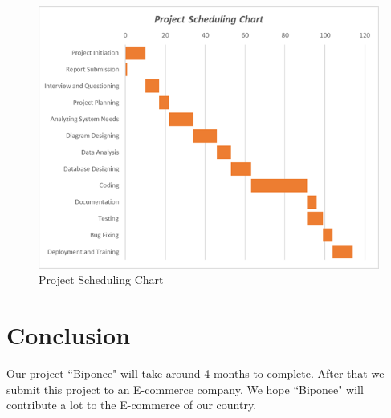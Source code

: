 \begin{figure}
 
\includegraphics{figures/gantt.png}
\caption{Project Scheduling Chart}
\end{figure}

\newpage


\section{Conclusion}
 Our project ``Biponee" will take around 4 months to complete. After that we submit this project to an E-commerce company. We hope ``Biponee" will contribute a lot to the E-commerce of our country. 













 
 
 






  
